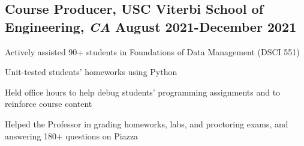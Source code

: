 \documentclass[11pt]{article}
\begin{document}
\subsection*{Course Producer{\normalfont, USC Viterbi School of Engineering,
            \textit{CA} \hfill
            August 2021-December 2021}}
\begin{compactitem}
    \item Actively assisted 90+ students in Foundations of Data Management
    (DSCI 551)
    \item Unit-tested students' homeworks using Python
    \item Held office hours to help debug students' programming assignments
    and to reinforce
    course content
    \item Helped the Professor in grading homeworks, labs, and proctoring exams, and
    answering 180+ questions on Piazza
\end{compactitem}


\end{document}
